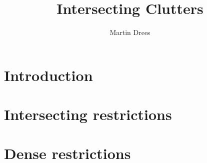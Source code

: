 \documentclass[a4paper, 12pt]{scrbook}
\title{Intersecting Clutters}
\author{Martin Drees}
\theoremstyle{definition}
\begin{document}
   \maketitle
   \tableofcontents
   \chapter{Introduction}
   \chapter{Intersecting restrictions}
   \chapter{Dense restrictions}
\end{document}
